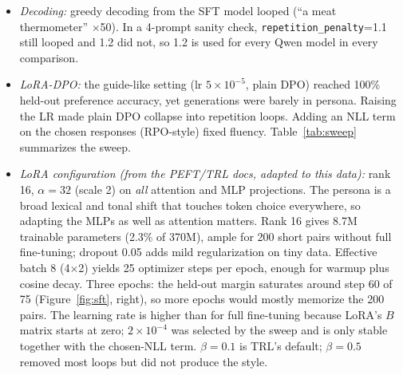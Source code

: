 \documentclass[10pt]{article}
\begin{document}
\begin{itemize}
\item \textit{Decoding:} greedy decoding from the SFT model looped (``a meat thermometer'' $\times$50). In a 4-prompt sanity check, \texttt{repetition\_penalty}=1.1 still looped and 1.2 did not, so 1.2 is used for every Qwen model in every comparison.
\item \textit{LoRA-DPO:} the guide-like setting (lr $5\!\times\!10^{-5}$, plain DPO) reached 100\% held-out preference accuracy, yet generations were barely in persona. Raising the LR made plain DPO collapse into repetition loops. Adding an NLL term on the chosen responses (RPO-style) fixed fluency. Table~\ref{tab:sweep} summarizes the sweep.
\item \emph{LoRA configuration (from the PEFT/TRL docs, adapted to this data):} rank 16, $\alpha=32$ (scale 2) on \emph{all} attention and MLP projections. The persona is a broad lexical and tonal shift that touches token choice everywhere, so adapting the MLPs as well as attention matters. Rank 16 gives 8.7M trainable parameters (2.3\% of 370M), ample for 200 short pairs without full fine-tuning; dropout 0.05 adds mild regularization on tiny data. Effective batch 8 (4$\times$2) yields 25 optimizer steps per epoch, enough for warmup plus cosine decay. Three epochs: the held-out margin saturates around step 60 of 75 (Figure~\ref{fig:sft}, right), so more epochs would mostly memorize the 200 pairs. The learning rate is higher than for full fine-tuning because LoRA's $B$ matrix starts at zero; $2\times10^{-4}$ was selected by the sweep and is only stable together with the chosen-NLL term. $\beta=0.1$ is TRL's default; $\beta=0.5$ removed most loops but did not produce the style.
\end{itemize}

\end{document}
